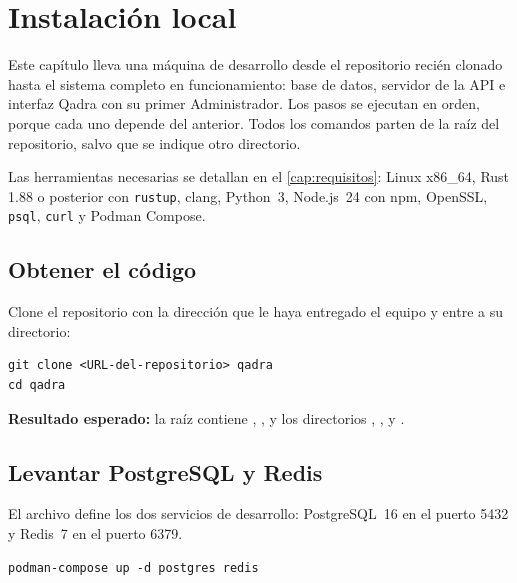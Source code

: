 \chapter{Instalación local}\label{cap:instalacion}

Este capítulo lleva una máquina de desarrollo desde el repositorio recién
clonado hasta el sistema completo en funcionamiento: base de datos, servidor
de la API e interfaz Qadra con su primer Administrador. Los pasos se ejecutan
en orden, porque cada uno depende del anterior. Todos los comandos parten de
la raíz del repositorio, salvo que se indique otro directorio.

Las herramientas necesarias se detallan en el \cref{cap:requisitos}: Linux
x86\_64, Rust 1.88 o posterior con \texttt{rustup}, clang, Python~3,
Node.js~24 con npm, OpenSSL, \texttt{psql}, \texttt{curl} y Podman Compose.


\section{Obtener el código}\label{sec:inst-clonar}

Clone el repositorio con la dirección que le haya entregado el equipo y entre
a su directorio:

\begin{verbatim}
git clone <URL-del-repositorio> qadra
cd qadra
\end{verbatim}

\textbf{Resultado esperado:} la raíz contiene ,
,  y los directorios
, ,  y .

\section{Levantar PostgreSQL y Redis}\label{sec:inst-servicios}

El archivo  define los dos servicios de desarrollo:
PostgreSQL~16 en el puerto 5432 y Redis~7 en el puerto 6379.

\begin{verbatim}
podman-compose up -d postgres redis
\end{verbatim}

